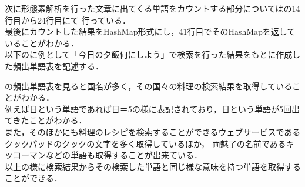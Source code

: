 次に形態素解析を行った文章に出てくる単語をカウントする部分についてはの14行目から24行目にて
行っている．
\\
最後にカウントした結果をHashMap形式にし，41行目でそのHashMapを返していることがわかる．
\\
以下のに例として「今日の夕飯何にしよう」で検索を行った結果をもとに作成した頻出単語表を記述する．


の頻出単語表を見ると国名が多く，その国々の料理の検索結果を取得していることがわかる．\\
例えば日という単語であれば日＝5の様に表記されており，日という単語が5回出てきたことがわかる．\\
また，そのほかにも料理のレシピを検索することができるウェブサービスであるクックパッドのクックの文字を多く取得しているほか，
両魅了の名前であるキッコーマンなどの単語も取得することが出来ている．\\

以上の様に検索結果からその検索した単語と同じ様な意味を持つ単語を取得することができる．\\
